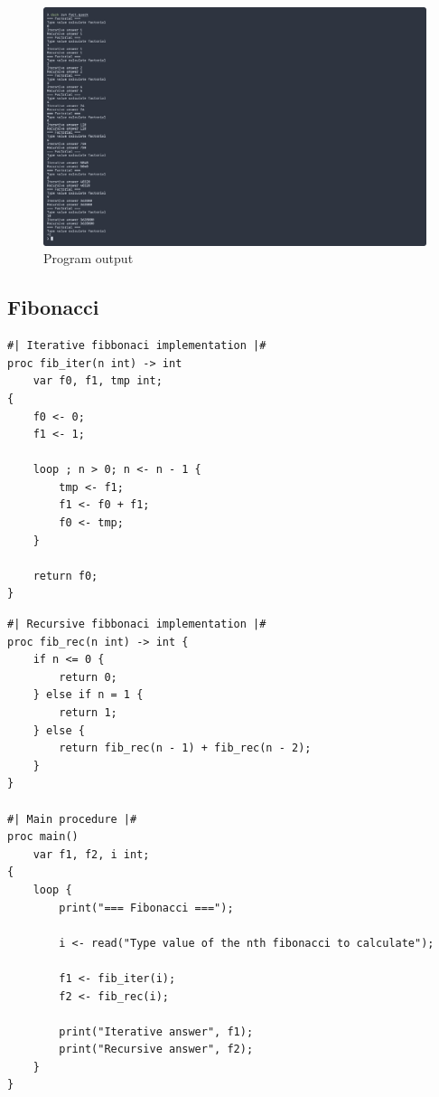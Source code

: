 \newpage

\begin{figure}[h]
    \centering
    \caption{Program output}
    \includegraphics[width=\textwidth]{evidences/fact_output}
\end{figure}

\subsection{Fibonacci}

\begin{verbatim}
#| Iterative fibbonaci implementation |#
proc fib_iter(n int) -> int 
    var f0, f1, tmp int;
{
    f0 <- 0;
    f1 <- 1;

    loop ; n > 0; n <- n - 1 {
        tmp <- f1;
        f1 <- f0 + f1;
        f0 <- tmp;
    }
    
    return f0;
}

\end{verbatim}

\newpage

\begin{verbatim}
#| Recursive fibbonaci implementation |#
proc fib_rec(n int) -> int {
    if n <= 0 {
        return 0;
    } else if n = 1 {
        return 1;
    } else {
        return fib_rec(n - 1) + fib_rec(n - 2);
    }
}

#| Main procedure |#
proc main() 
    var f1, f2, i int;
{
    loop {
        print("=== Fibonacci ===");

        i <- read("Type value of the nth fibonacci to calculate");

        f1 <- fib_iter(i);
        f2 <- fib_rec(i);

        print("Iterative answer", f1);
        print("Recursive answer", f2);
    }
}
\end{verbatim}

